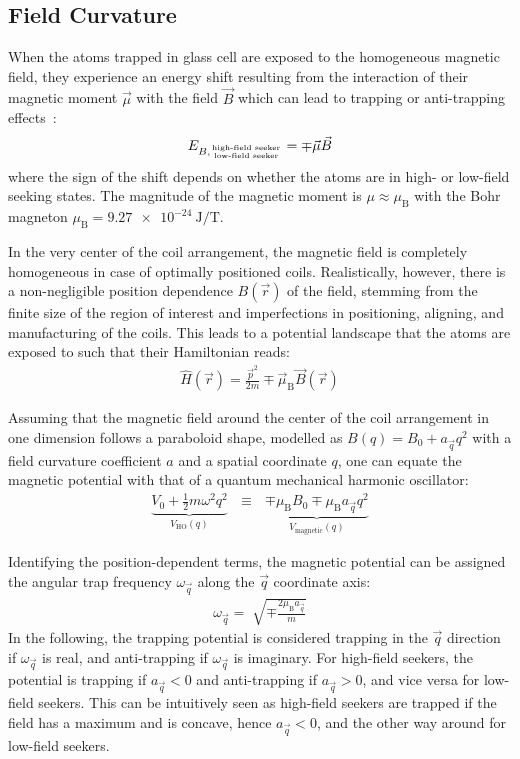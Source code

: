 \subsection*{Field Curvature}\label{ch:field_curvature_definition}
When the atoms trapped in glass cell are exposed to the homogeneous magnetic field, they experience an energy shift resulting from the interaction of their magnetic moment $\vec \mu$ with the field $\vec B$ which can lead to trapping or anti-trapping effects~\cite{pritchard_cooling_1983,gehm_properties_2003, hagemann_setup_2020}:
\begin{align}
    E_{B, {\text{high-field seeker} \atop \text{low-field seeker}}} = \mp \vec \mu \vec B
\end{align}
where the sign of the shift depends on whether the atoms are in high- or low-field seeking states. The magnitude of the magnetic moment is $\mu \approx \mu_\text{B}$ with the Bohr magneton $\mu_\text{B} = \SI{9.27e-24}{\joule\per\tesla}$.

In the very center of the coil arrangement, the magnetic field is completely homogeneous in case of optimally positioned coils. Realistically, however, there is a non-negligible position dependence $B(\vec r)$ of the field, stemming from the finite size of the region of interest and imperfections in positioning, aligning, and manufacturing of the coils. This leads to a potential landscape that the atoms are exposed to such that their Hamiltonian reads:
\begin{align}
    \hat H(\vec r) = \frac{\vec p^2}{2m} \mp \vec \mu_\text{B} \vec B(\vec r)
\end{align}

Assuming that the magnetic field around the center of the coil arrangement in one dimension follows a paraboloid shape, modelled as $B(q) = B_0 + a_{\vec q} q^2$ with a field curvature coefficient $a$ and a spatial coordinate $q$, one can equate the magnetic potential with that of a quantum mechanical harmonic oscillator:
\begin{align}
    \underbrace{V_0 + \frac{1}{2}m\omega^2q^2}_{V_\text{HO}(q)} ~~~\equiv~~~ \underbrace{\mp \mu_\text{B} B_0 \mp \mu_\text{B} a_{\vec q} q^2}_{V_\text{magnetic}(q)}
\end{align}

Identifying the position-dependent terms, the magnetic potential can be assigned the angular trap frequency $\omega_{\vec q}$ along the $\vec q$ coordinate axis:
\begin{align}\label{eq:trap_omega_definition}
    \omega_{\vec q} = \sqrt[]{\mp\frac{2 \mu_\text{B} a_{\vec q}}{m}}
\end{align}
In the following, the trapping potential is considered trapping in the ${\vec q}$ direction if $\omega_{\vec q}$ is real, and anti-trapping if $\omega_{\vec q}$ is imaginary. For high-field seekers, the potential is trapping if $a_{\vec q} < 0$ and anti-trapping if $a_{\vec q} > 0$, and vice versa for low-field seekers. This can be intuitively seen as high-field seekers are trapped if the field has a maximum and is concave, hence $a_{\vec q} < 0$, and the other way around for low-field seekers.

